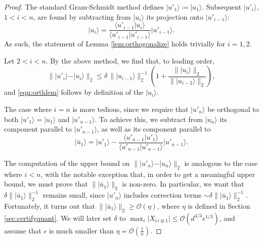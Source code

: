 \begin{proof}
The standard Gram-Schmidt method defines $\vert u'_1 \rangle \coloneqq \vert u_1 \rangle$. Subsequent $\vert u'_i \rangle$, $1< i < n$, are found by subtracting from $\vert u_i \rangle$ its projection onto $\vert u'_{i-1}\rangle$:
\begin{equation}
\vert u_i \rangle = \frac{\langle u'_{i-1} \vert u_i \rangle}{\langle  u'_{i-1} \vert  u'_{i-1} \rangle}\vert  u'_{i-1} \rangle.
\end{equation}
As such, the statement of Lemma \ref{lem:orthogonalize} holds trivially for $i=1,2$. 

Let $2<i<n$. By the above method, we find that, to leading order,
\begin{equation}
\|\vert u'_i \rangle - \vert u_i \rangle\|_2 \leq \delta\, \|\vert u_{i-1}\rangle\|_2^{-1}\left(1+\frac{\|\vert u_{i} \rangle \|_2}{\|\vert u_{i-2}\rangle \|_2}\right),
\end{equation}
and \ref{eqn:orthlem} follows by definition of the $\vert u_i \rangle$. 

The case where $i=n$ is more tedious, since we require that $\vert u'_n \rangle$ be orthogonal to both $\vert u'_1 \rangle = \vert u_1 \rangle$  and $\vert u'_{n-1} \rangle$. To achieve this, we subtract from $\vert u_n \rangle$ its component parallel to $\vert u'_{n-1} \rangle$, as well as its component parallel to \[\vert \bar{u}_1 \rangle=\vert u'_1 \rangle-\frac{\langle u'_{n-1} \vert u'_{1} \rangle}{\langle u'_{n-1}\vert u'_{n-1}\rangle}\vert u'_{n-1} \rangle.\]

The computation of the upper bound on $\|\vert u'_n \rangle - \vert u_n\rangle \|_2$ is analogous to the case where $i<n$, with the notable exception that, in order to get a meaningful upper bound, we must prove that $\|\vert \bar{u}_1 \rangle \|_2$ is non-zero. In particular, we want that $\delta\|\vert \bar{u}_1 \rangle \|_2^{-1}$ remains small, since $\vert u'_n \rangle$ includes correction terms $\sim \delta \| \vert \bar{u}_1 \rangle \|_2^{-1}$. Fortunately, it turns out that $\| \vert \bar{u}_1 \rangle \|_2 \geq \mathcal{O}\left(\eta\right)$, where $\eta$ is defined in Section \ref{sec:certifyquant}. We will later set $\delta$ to $\max_i \vert X_{i\,i\oplus 1}\vert \leq \mathcal{O}\left(d^{4/3}\epsilon^{1/3}\right)$, and assume that $\epsilon$ is much smaller than $\eta=\mathcal{O}(\frac{1}{n})$.


\end{proof}
